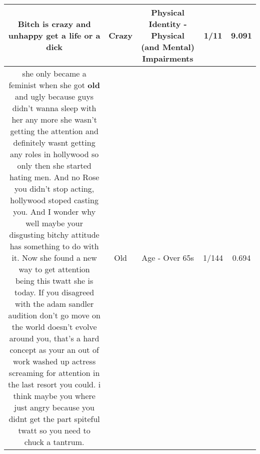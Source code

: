 \documentclass[11pt]{article}
\newlength\mylength
\begin{document}
\begin{center}
\begin{longtable}{|C{.65\mylength}|C{.30\mylength}|C{.12\mylength}|C{.12\mylength}|C{.12\mylength}|}
  \small Bitch is \textbf{crazy} and unhappy get a life or a dick\normalsize   & Crazy & Physical Identity - Physical (and Mental) Impairments & 1/11 & 9.091 \\  \hline
  \small she only became a feminist when she got \textbf{old} and ugly because guys didn't wanna sleep with her any more she wasn't getting the attention and definitely wasnt getting any roles in hollywood so only then she started hating men. And no Rose you didn't stop acting, hollywood stoped casting you. And I wonder why well maybe your disgusting bitchy attitude has something to do with it. Now she found a new way to get attention being this twatt she is today. If you disagreed with the adam sandler audition don't go move on the world doesn't evolve around you, that's a hard concept as your an out of work washed up actress screaming for attention in the last resort you could. i think maybe you where just angry because you didnt get the part spiteful twatt so you need to chuck a tantrum.\normalsize   & Old & Age - Over 65s & 1/144 & 0.694 \\  \hline

\end{longtable}
\end{center}
\end{document}
